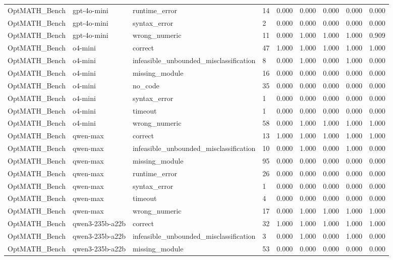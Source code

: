 \begin{table}[t]
\begin{tabular}{lllllllll}
OptMATH\_Bench & gpt-4o-mini & runtime\_error & 14 & 0.000 & 0.000 & 0.000 & 0.000 & 0.000 \\
OptMATH\_Bench & gpt-4o-mini & syntax\_error & 2 & 0.000 & 0.000 & 0.000 & 0.000 & 0.000 \\
OptMATH\_Bench & gpt-4o-mini & wrong\_numeric & 11 & 0.000 & 1.000 & 1.000 & 1.000 & 0.909 \\
OptMATH\_Bench & o4-mini & correct & 47 & 1.000 & 1.000 & 1.000 & 1.000 & 1.000 \\
OptMATH\_Bench & o4-mini & infeasible\_unbounded\_misclassification & 8 & 0.000 & 1.000 & 0.000 & 1.000 & 0.000 \\
OptMATH\_Bench & o4-mini & missing\_module & 16 & 0.000 & 0.000 & 0.000 & 0.000 & 0.000 \\
OptMATH\_Bench & o4-mini & no\_code & 35 & 0.000 & 0.000 & 0.000 & 0.000 & 0.000 \\
OptMATH\_Bench & o4-mini & syntax\_error & 1 & 0.000 & 0.000 & 0.000 & 0.000 & 0.000 \\
OptMATH\_Bench & o4-mini & timeout & 1 & 0.000 & 0.000 & 0.000 & 0.000 & 0.000 \\
OptMATH\_Bench & o4-mini & wrong\_numeric & 58 & 0.000 & 1.000 & 1.000 & 1.000 & 1.000 \\
OptMATH\_Bench & qwen-max & correct & 13 & 1.000 & 1.000 & 1.000 & 1.000 & 1.000 \\
OptMATH\_Bench & qwen-max & infeasible\_unbounded\_misclassification & 10 & 0.000 & 1.000 & 0.000 & 1.000 & 0.000 \\
OptMATH\_Bench & qwen-max & missing\_module & 95 & 0.000 & 0.000 & 0.000 & 0.000 & 0.000 \\
OptMATH\_Bench & qwen-max & runtime\_error & 26 & 0.000 & 0.000 & 0.000 & 0.000 & 0.000 \\
OptMATH\_Bench & qwen-max & syntax\_error & 1 & 0.000 & 0.000 & 0.000 & 0.000 & 0.000 \\
OptMATH\_Bench & qwen-max & timeout & 4 & 0.000 & 0.000 & 0.000 & 0.000 & 0.000 \\
OptMATH\_Bench & qwen-max & wrong\_numeric & 17 & 0.000 & 1.000 & 1.000 & 1.000 & 1.000 \\
OptMATH\_Bench & qwen3-235b-a22b & correct & 32 & 1.000 & 1.000 & 1.000 & 1.000 & 1.000 \\
OptMATH\_Bench & qwen3-235b-a22b & infeasible\_unbounded\_misclassification & 3 & 0.000 & 1.000 & 0.000 & 1.000 & 0.000 \\
OptMATH\_Bench & qwen3-235b-a22b & missing\_module & 53 & 0.000 & 0.000 & 0.000 & 0.000 & 0.000 \\

\end{tabular}
\end{table}
